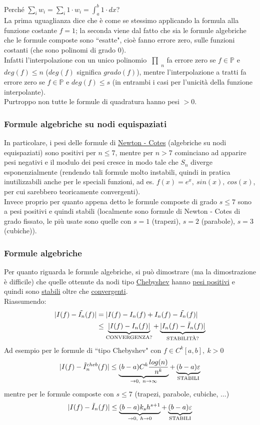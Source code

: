 \documentclass[12pt,a4paper]{article}
\DeclarePairedDelimiter{\abs}{\lvert}{\rvert}
\newcommand{\inter}{\begin{matrix}\prod\end{matrix}}
\begin{document}
Perché $\sum_i w_i = \sum_i 1 \cdot w_i = \int_a^b 1 \cdot dx$?\\
La prima uguaglianza dice che è come se stessimo applicando la formula alla funzione costante $f=1$; la seconda viene dal fatto
che sia le formule algebriche che le formule composte sono ``esatte", cioè fanno errore zero, sulle funzioni costanti (che sono polinomi di grado 0).\\
Infatti l'interpolazione con un unico polinomio $\inter_n$ fa errore zero se $f \in \mathbb{P}$ e $deg(f) \le n$ ($deg(f)$ significa $grado(f)$), mentre l'interpolazione a tratti fa errore zero se $f \in \mathbb{P}$ e $deg(f) \le s$ (in entrambi i casi per l'unicità della funzione interpolante).\\
Purtroppo non tutte le formule di quadratura hanno pesi $>0$.

\subsubsection{Formule algebriche su nodi equispaziati}
In particolare, i pesi delle formule di \uline{Newton - Cotes} (algebriche su nodi equispaziati) sono positivi per $n \le 7$, mentre per $n>7$ cominciano ad apparire pesi negativi e il modulo dei pesi cresce in modo tale che $S_n$ diverge esponenzialmente (rendendo tali formule molto instabili, quindi in pratica inutilizzabili anche per le speciali funzioni, ad es. $f(x) = e^x, \ sin(x), \ cos(x)$, per cui sarebbero teoricamente convergenti).\\
Invece proprio per quanto appena detto le formule composte di grado $s \le 7$ sono a pesi positivi e quindi stabili (localmente sono formule di Newton - Cotes di grado fissato, le più usate sono quelle con $s=1$ (trapezi), $s=2$ (parabole), $s=3$ (cubiche)).

\subsubsection{Formule algebriche}
Per quanto riguarda le formule algebriche, si può dimostrare (ma la dimostrazione è difficile) che quelle ottenute da nodi tipo \uline{Chebyshev} hanno \uline{pesi positivi} e quindi sono \uline{stabili} oltre che \uline{convergenti}.\\
Riassumendo:
\[
\begin{split}
\abs{I(f) - \tilde{I_n}(f)} & = \abs{I(f) - I_n(f) + I_n (f) - \tilde{I_n}(f)} \\
& \le \underbrace{\abs{I(f) - I_n (f)}}_{\text{CONVERGENZA?}} + \underbrace{\abs{I_n (f) - \tilde{I}_n (f)}}_{\text{STABILITÀ?}}
\end{split}
\]
Ad esempio per le formule di ``tipo Chebyshev" con $f \in C^k [a,b], \ k > 0$
\[
\abs{I(f) - \tilde{I}_n^{cheb}(f)} \le \underbrace{(b-a) C^k \frac{log(n)}{n^k}}_{\to 0, \ n \to \infty} + \underbrace{(b-a)\varepsilon}_{\text{STABILI}}
\]
mentre per le formule composte con $s \le 7$ (trapezi, parabole, cubiche, $\dotso$)
\[
\abs{I(f) - \tilde{I}_n(f)} \le \underbrace{(b-a)k_s h^{s+1}}_{\to 0, \ h \to 0} + \underbrace{(b-a)\varepsilon}_{\text{STABILI}}
\]
\end{document}
